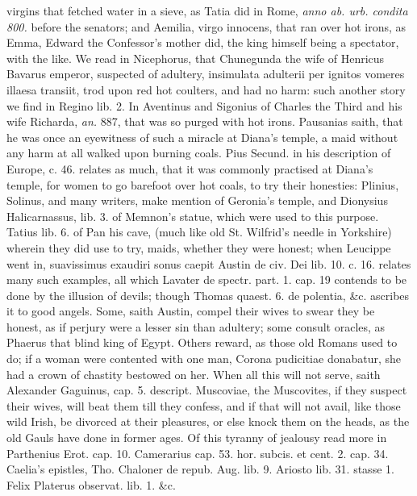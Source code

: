 {virgins that fetched water in a sieve, as Tatia did in Rome, \emph{anno ab.
urb. condita 800.} before the senators; and Aemilia, virgo
innocens, that ran over hot irons, as Emma, Edward the Confessor's
mother did, the king himself being a spectator, with the like. We read
in Nicephorus, that Chunegunda the wife of Henricus Bavarus emperor,
suspected of adultery, insimulata adulterii per ignitos vomeres illaesa
transiit, trod upon red hot coulters, and had no harm: such another
story we find in Regino lib. 2. In Aventinus and Sigonius of Charles
the Third and his wife Richarda, \emph{an.} 887, that was so purged with hot
irons. Pausanias saith, that he was once an eyewitness of such a
miracle at Diana's temple, a maid without any harm at all walked upon
burning coals. Pius Secund. in his description of Europe, c. 46.
relates as much, that it was commonly practised at Diana's temple, for
women to go barefoot over hot coals, to try their honesties: Plinius,
Solinus, and many writers, make mention of Geronia's temple, and
Dionysius Halicarnassus, lib. 3. of Memnon's statue, which were used to
this purpose. Tatius lib. 6. of Pan his cave, (much like old St.
Wilfrid's needle in Yorkshire) wherein they did use to try, maids,
whether they were honest; when Leucippe went in, suavissimus
exaudiri sonus caepit Austin de civ. Dei lib. 10. c. 16. relates many
such examples, all which Lavater de spectr. part. 1. cap. 19 contends
to be done by the illusion of devils; though Thomas quaest. 6. de
polentia, \&c. ascribes it to good angels. Some, saith Austin,
compel their wives to swear they be honest, as if perjury were a lesser
sin than adultery; some consult oracles, as Phaerus that blind
king of Egypt. Others reward, as those old Romans used to do; if a
woman were contented with one man, Corona pudicitiae donabatur, she had
a crown of chastity bestowed on her. When all this will not serve,
saith Alexander Gaguinus, cap. 5. descript. Muscoviae, the Muscovites,
if they suspect their wives, will beat them till they confess, and if
that will not avail, like those wild Irish, be divorced at their
pleasures, or else knock them on the heads, as the old Gauls have
done in former ages. Of this tyranny of jealousy read more in
Parthenius Erot. cap. 10. Camerarius cap. 53. hor. subcis. et cent. 2.
cap. 34. Caelia's epistles, Tho. Chaloner de repub. Aug. lib. 9.
Ariosto lib. 31. stasse 1. Felix Platerus observat. lib. 1. \&c.

}
